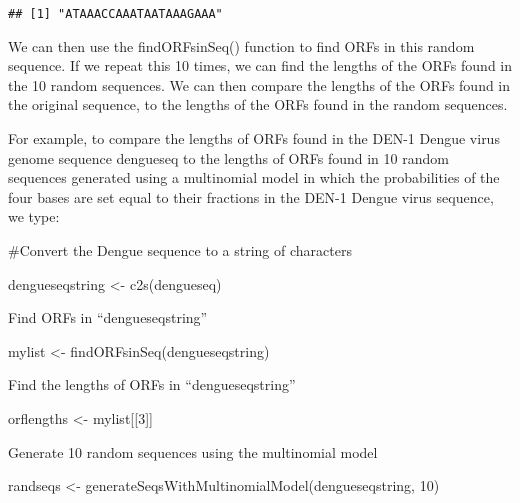 \documentclass[
]{book}
\newenvironment{Shaded}{\begin{snugshade}}{\end{snugshade}}
\newcommand{\DecValTok}[1]{\textcolor[rgb]{0.00,0.00,0.81}{#1}}
\newcommand{\FunctionTok}[1]{\textcolor[rgb]{0.00,0.00,0.00}{#1}}
\newcommand{\NormalTok}[1]{#1}
\newcommand{\OtherTok}[1]{\textcolor[rgb]{0.56,0.35,0.01}{#1}}
\begin{document}
\begin{verbatim}
## [1] "ATAAACCAAATAATAAAGAAA"
\end{verbatim}

We can then use the findORFsinSeq() function to find ORFs in this random sequence. If we repeat this 10 times, we can find the lengths of the ORFs found in the 10 random sequences. We can then compare the lengths of the ORFs found in the original sequence, to the lengths of the ORFs found in the random sequences.

For example, to compare the lengths of ORFs found in the DEN-1 Dengue virus genome sequence dengueseq to the lengths of ORFs found in 10 random sequences generated using a multinomial model in which the probabilities of the four bases are set equal to their fractions in the DEN-1 Dengue virus sequence, we type:

\#Convert the Dengue sequence to a string of characters

\begin{Shaded}
\begin{Highlighting}[]
\NormalTok{dengueseqstring }\OtherTok{\textless{}{-}} \FunctionTok{c2s}\NormalTok{(dengueseq)   }
\end{Highlighting}
\end{Shaded}

Find ORFs in ``dengueseqstring''

\begin{Shaded}
\begin{Highlighting}[]
\NormalTok{mylist }\OtherTok{\textless{}{-}} \FunctionTok{findORFsinSeq}\NormalTok{(dengueseqstring)  }
\end{Highlighting}
\end{Shaded}

Find the lengths of ORFs in ``dengueseqstring''

\begin{Shaded}
\begin{Highlighting}[]
\NormalTok{orflengths }\OtherTok{\textless{}{-}}\NormalTok{ mylist[[}\DecValTok{3}\NormalTok{]]  }
\end{Highlighting}
\end{Shaded}

Generate 10 random sequences using the multinomial model

\begin{Shaded}
\begin{Highlighting}[]
\NormalTok{randseqs }\OtherTok{\textless{}{-}} \FunctionTok{generateSeqsWithMultinomialModel}\NormalTok{(dengueseqstring, }\DecValTok{10}\NormalTok{) }
\end{Highlighting}
\end{Shaded}
\end{document}
